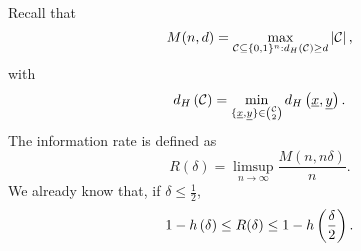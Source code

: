Recall that
\begin{equation*}
	M(n, d) = \max_{\mathcal{C} \subseteq \{0, 1\}^n : d_H \left({\mathcal{C}}\right) \ge d} \left|{\mathcal{C}}\right|,
\end{equation*}
with
\begin{equation*}
	d_H \left({\mathcal{C}}\right)
	=
	\min_{\{\underline{x}, \underline{y}\} \in \binom{\mathcal{C}}{2}} d_H \left({\underline{x}, \underline{y}}\right).
\end{equation*}
The information rate is defined as
\begin{equation*}
	R(\delta) = \limsup_{n \to \infty} \frac{M(n, n \delta)}{n}.
\end{equation*}
We already know that, if $\delta \leq \frac{1}{2}$,
\begin{equation*}
	1 - h\left({\delta}\right) \le R(\delta) \le 1 - h\left({\frac{\delta}{2}}\right).
\end{equation*}

